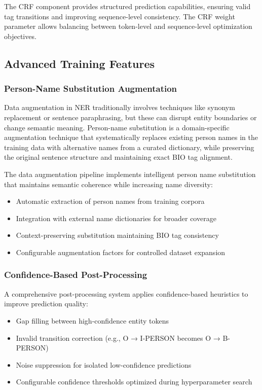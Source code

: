 \documentclass[a4paper]{usiinfbachelorproject}
\begin{document}
The CRF component provides structured prediction capabilities, ensuring valid tag transitions and improving sequence-level consistency. The CRF weight parameter allows balancing between token-level and sequence-level optimization objectives.

\subsection{Advanced Training Features}

\subsubsection{Person-Name Substitution Augmentation}

Data augmentation in NER traditionally involves techniques like synonym replacement or sentence paraphrasing, but these can disrupt entity boundaries or change semantic meaning. Person-name substitution is a domain-specific augmentation technique that systematically replaces existing person names in the training data with alternative names from a curated dictionary, while preserving the original sentence structure and maintaining exact BIO tag alignment.

The data augmentation pipeline implements intelligent person name substitution that maintains semantic coherence while increasing name diversity:

\begin{itemize}
    \item Automatic extraction of person names from training corpora
    \item Integration with external name dictionaries for broader coverage
    \item Context-preserving substitution maintaining BIO tag consistency
    \item Configurable augmentation factors for controlled dataset expansion
\end{itemize}

\subsubsection{Confidence-Based Post-Processing}

A comprehensive post-processing system applies confidence-based heuristics to improve prediction quality:

\begin{itemize}
    \item Gap filling between high-confidence entity tokens
    \item Invalid transition correction (e.g., O → I-PERSON becomes O → B-PERSON)
    \item Noise suppression for isolated low-confidence predictions
    \item Configurable confidence thresholds optimized during hyperparameter search
\end{itemize}
\end{document}
